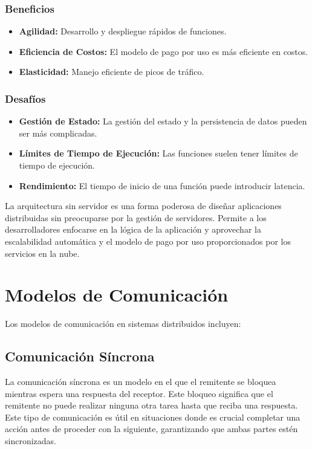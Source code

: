 	\subsubsection{Beneficios}
	\begin{itemize}
		\item \textbf{Agilidad:} Desarrollo y despliegue rápidos de funciones.
		\item \textbf{Eficiencia de Costos:} El modelo de pago por uso es más eficiente en costos.
		\item \textbf{Elasticidad:} Manejo eficiente de picos de tráfico.
	\end{itemize}
	
	\subsubsection{Desafíos}
	\begin{itemize}
		\item \textbf{Gestión de Estado:} La gestión del estado y la persistencia de datos pueden ser más complicadas.
		\item \textbf{Límites de Tiempo de Ejecución:} Las funciones suelen tener límites de tiempo de ejecución.
		\item \textbf{Rendimiento:} El tiempo de inicio de una función puede introducir latencia.
	\end{itemize}
	
	\begin{tcolorbox}[colback=yellow!10!white, colframe=blue!50!black, title=Resumiendo, coltitle=white]
		La arquitectura sin servidor es una forma poderosa de diseñar aplicaciones distribuidas sin preocuparse por la gestión de servidores. Permite a los desarrolladores enfocarse en la lógica de la aplicación y aprovechar la escalabilidad automática y el modelo de pago por uso proporcionados por los servicios en la nube.
	\end{tcolorbox}
	
	\section{Modelos de Comunicación}
		Los modelos de comunicación en sistemas distribuidos incluyen:
		
		\subsection{Comunicación Síncrona}
			La comunicación síncrona es un modelo en el que el remitente se bloquea mientras espera una respuesta del receptor. Este bloqueo significa que el remitente no puede realizar ninguna otra tarea hasta que reciba una respuesta. Este tipo de comunicación es útil en situaciones donde es crucial completar una acción antes de proceder con la siguiente, garantizando que ambas partes estén sincronizadas.
			
